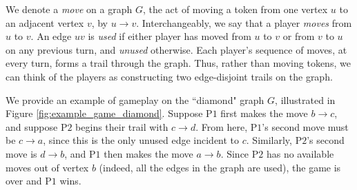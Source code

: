 \documentclass{article}
\theoremstyle{plain}
\theoremstyle{definition}
\def\pone{{\rm{P}\ensuremath{1}}}
\def\ptwo{{\rm{P}\ensuremath{2}}}
\def\poneposs{{\rm{P}\ensuremath{1}'s}}
\def\ptwoposs{{\rm{P}\ensuremath{2}'s}}
\begin{document}
We denote a \emph{move} on a graph $G$, the act of moving a token from one vertex $u$ to an adjacent vertex $v$, by $u\to v$. Interchangeably, we say that a player \emph{moves} from $u$ to $v$. An edge $uv$ is \emph{used} if either player has moved from $u$ to $v$ or from $v$ to $u$ on any previous turn, and \emph{unused} otherwise. Each player's sequence of moves, at every turn, forms a trail through the graph. Thus, rather than moving tokens, we can think of the players as constructing two edge-disjoint trails on the graph. 

We provide an example of gameplay on the ``diamond" graph $G$, illustrated in Figure \ref{fig:example_game_diamond}. Suppose \pone{} first makes the move $b \to c$, and suppose \ptwo{} begins their trail with $c \to d$. From here, \poneposs{} second move must be $c \to a$, since this is the only unused edge incident to $c$. Similarly, \ptwoposs{} second move is $d \to b$, and \pone{} then makes the move $a \to b$. Since \ptwo{} has no available moves out of vertex $b$ (indeed, all the edges in the graph are used), the game is over and \pone{} wins. 
\end{document}
